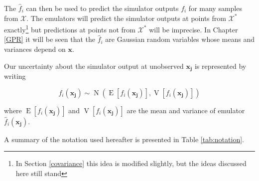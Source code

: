 \documentclass[
  12pt,
  a4paper,
  twoside]{book}
\DeclareMathOperator{\E}{E}
\DeclareMathOperator{\N}{N}
\DeclareMathOperator{\V}{V}
\begin{document}
The \(\hat{f}_i\) can then be used to predict the simulator outputs \(f_i\) for many samples from \(\mathcal{X}\). The emulators will predict the simulator outputs at points from \(\mathcal{X}^*\) exactly\footnote{In Section \ref{covariance} this idea is modified slightly, but the ideas discussed here still stand} but predictions at points not from \(\mathcal{X}^*\) will be imprecise. In Chapter \ref{GPR} it will be seen that the \(\hat{f}_i\) are Gaussian random variables whose means and variances depend on \(\mathbf{x}\).

Our uncertainty about the simulator output at unobserved \(\mathbf{x_j}\) is represented by writing

\begin{equation}
\label{eq:emulator-uncertainty}
f_i(\mathbf{x_j}) \sim \N\left(\E[f_i(\mathbf{x_j})],\V[f_i(\mathbf{x_j})] \right)
\end{equation}

where \(\E[f_i(\mathbf{x_j})]\) and \(\V[f_i(\mathbf{x_j})]\) are the mean and variance of emulator \(\hat{f}_i(\mathbf{x_j})\).

A summary of the notation used hereafter is presented in Table \ref{tab:notation}.
\end{document}
